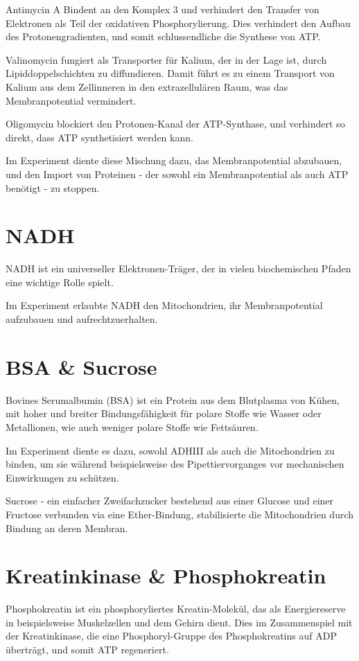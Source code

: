 \documentclass[a4paper,german]{scrreprt}
\begin{document}
Antimycin A Bindent an den Komplex 3 und verhindert den Transfer von Elektronen
als Teil der oxidativen Phosphorylierung. Dies verhindert den Aufbau des
Protonengradienten, und somit schlussendliche die Synthese von ATP.

Valinomycin fungiert als Transporter für Kalium, der in der Lage ist, durch
Lipiddoppelschichten zu diffundieren. Damit führt es zu einem Transport von
Kalium aus dem Zellinneren in den extrazellulären Raum, was das
Membranpotential vermindert.

Oligomycin blockiert den Protonen-Kanal der ATP-Synthase, und verhindert so
direkt, dass ATP synthetisiert werden kann.

Im Experiment diente diese Mischung dazu, das Membranpotential abzubauen, und den
Import von Proteinen - der sowohl ein Membranpotential als auch ATP benötigt - zu
stoppen.

\section{NADH}

NADH ist ein universeller Elektronen-Träger, der in vielen biochemischen Pfaden
eine wichtige Rolle spielt.

Im Experiment erlaubte NADH den Mitochondrien, ihr Membranpotential aufzubauen
und aufrechtzuerhalten.

\section{BSA \& Sucrose}

Bovines Serumalbumin (BSA) ist ein Protein aus dem Blutplasma von Kühen, mit
hoher und breiter Bindungsfähigkeit für polare Stoffe wie Wasser oder
Metallionen, wie auch weniger polare Stoffe wie Fettsäuren.

Im Experiment diente es dazu, sowohl ADHIII als auch die Mitochondrien zu
binden, um sie während beispielsweise des Pipettiervorganges vor mechanischen
Einwirkungen zu schützen.

Sucrose - ein einfacher Zweifachzucker bestehend aus einer Glucose und einer
Fructose verbunden via eine Ether-Bindung, stabilisierte die Mitochondrien
durch Bindung an deren Membran.

\section{Kreatinkinase \& Phosphokreatin}

Phosphokreatin ist ein phosphoryliertes Kreatin-Molekül, das als Energiereserve
in beispielsweise Muskelzellen und dem Gehirn dient. Dies im Zusammenspiel mit
der Kreatinkinase, die eine Phosphoryl-Gruppe des Phosphokreatins auf ADP
überträgt, und somit ATP regeneriert.
\end{document}
